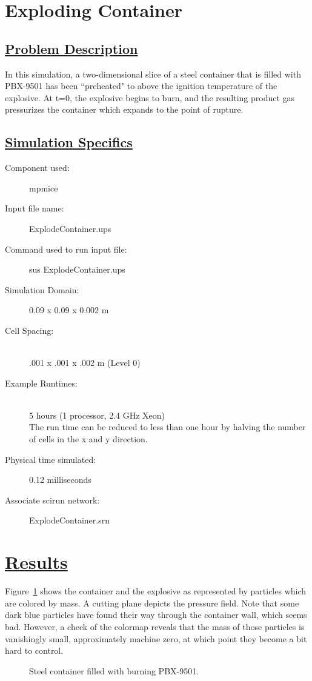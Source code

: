 \documentclass[fleqn]{article}
\begin{document}
\section*{\center Exploding Container}
\subsection*{\underline{Problem Description}}

In this simulation, a two-dimensional slice of a steel container that
is filled with PBX-9501 has been ``preheated" to above the ignition temperature
of the explosive.  At t=0, the explosive begins to burn, and the resulting
product gas pressurizes the container which expands to the point of rupture.

\subsection*{\underline{Simulation Specifics}}
\begin{description} 
\item [Component used:] \hfill mpmice
\item [Input file name:] \hfill ExplodeContainer.ups
\item [Command used to run input file:]\hfill sus ExplodeContainer.ups

\item [Simulation Domain:]\hfill    0.09 x 0.09 x 0.002 m

\item [Cell Spacing:]\hfill \\ 
.001 x .001 x .002 m (Level 0)

\item [Example Runtimes:] \hfill \\
 5 hours   (1 processor, 2.4 GHz Xeon)\\
 The run time can be reduced to less than one hour by halving the number
 of cells in the x and y direction.

\item [Physical time simulated:] \hfill 0.12 milliseconds

\item [Associate scirun network:] \hfill ExplodeContainer.srn

\end{description}

\section*{\underline{Results}}

Figure~\ref{figexpcont} shows the container and the explosive as
represented by particles which are colored by mass.  A cutting plane
depicts the pressure field.  Note that some dark blue particles have
found their way through the container wall, which seems bad.  However,
a check of the colormap reveals that the mass of those particles is
vanishingly small, approximately machine zero, at which point they
become a bit hard to control.

\begin{figure}[b]
  \center
  \caption{Steel container filled with burning PBX-9501.}
  \label{figexpcont}
\end{figure}
\end{document}
